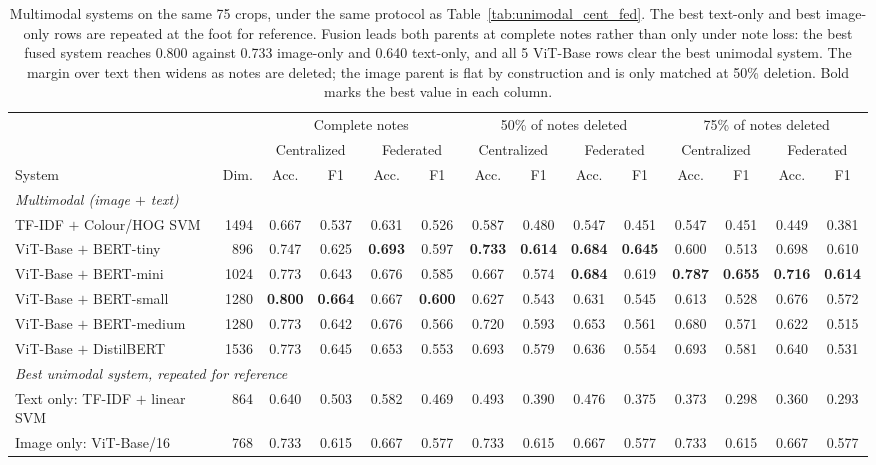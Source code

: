 \documentclass[conference]{IEEEtran}
\begin{document}
\begin{table}[t]
\caption{Multimodal systems on the same 75 crops, under the same protocol as Table~\ref{tab:unimodal_cent_fed}. The best text-only and best image-only rows are repeated at the foot for reference. Fusion leads both parents at complete notes rather than only under note loss: the best fused system reaches 0.800 against 0.733 image-only and 0.640 text-only, and all 5 ViT-Base rows clear the best unimodal system. The margin over text then widens as notes are deleted; the image parent is flat by construction and is only matched at 50\% deletion. Bold marks the best value in each column.}
\label{tab:multimodal_cent_fed}
\centering\footnotesize
\setlength\tabcolsep{4pt}
\begin{tabular}{lrcccccccccccc}
\toprule
 &  & \multicolumn{4}{c}{Complete notes} & \multicolumn{4}{c}{50\% of notes deleted} & \multicolumn{4}{c}{75\% of notes deleted}\\
\cmidrule(lr){3-6}\cmidrule(lr){7-10}\cmidrule(lr){11-14}
 &  & \multicolumn{2}{c}{Centralized} & \multicolumn{2}{c}{Federated} & \multicolumn{2}{c}{Centralized} & \multicolumn{2}{c}{Federated} & \multicolumn{2}{c}{Centralized} & \multicolumn{2}{c}{Federated}\\
\cmidrule(lr){3-4}\cmidrule(lr){5-6}\cmidrule(lr){7-8}\cmidrule(lr){9-10}\cmidrule(lr){11-12}\cmidrule(lr){13-14}
System & Dim. & Acc. & F1 & Acc. & F1 & Acc. & F1 & Acc. & F1 & Acc. & F1 & Acc. & F1\\
\midrule
\multicolumn{14}{l}{\emph{Multimodal (image $+$ text)}}\\
TF-IDF $+$ Colour/HOG SVM & 1494 & 0.667 & 0.537 & 0.631 & 0.526 & 0.587 & 0.480 & 0.547 & 0.451 & 0.547 & 0.451 & 0.449 & 0.381\\
ViT-Base $+$ BERT-tiny & 896 & 0.747 & 0.625 & \textbf{0.693} & 0.597 & \textbf{0.733} & \textbf{0.614} & \textbf{0.684} & \textbf{0.645} & 0.600 & 0.513 & 0.698 & 0.610\\
ViT-Base $+$ BERT-mini & 1024 & 0.773 & 0.643 & 0.676 & 0.585 & 0.667 & 0.574 & \textbf{0.684} & 0.619 & \textbf{0.787} & \textbf{0.655} & \textbf{0.716} & \textbf{0.614}\\
ViT-Base $+$ BERT-small & 1280 & \textbf{0.800} & \textbf{0.664} & 0.667 & \textbf{0.600} & 0.627 & 0.543 & 0.631 & 0.545 & 0.613 & 0.528 & 0.676 & 0.572\\
ViT-Base $+$ BERT-medium & 1280 & 0.773 & 0.642 & 0.676 & 0.566 & 0.720 & 0.593 & 0.653 & 0.561 & 0.680 & 0.571 & 0.622 & 0.515\\
ViT-Base $+$ DistilBERT & 1536 & 0.773 & 0.645 & 0.653 & 0.553 & 0.693 & 0.579 & 0.636 & 0.554 & 0.693 & 0.581 & 0.640 & 0.531\\
\midrule
\multicolumn{14}{l}{\emph{Best unimodal system, repeated for reference}}\\
Text only: TF-IDF $+$ linear SVM & 864 & 0.640 & 0.503 & 0.582 & 0.469 & 0.493 & 0.390 & 0.476 & 0.375 & 0.373 & 0.298 & 0.360 & 0.293\\
Image only: ViT-Base/16 & 768 & 0.733 & 0.615 & 0.667 & 0.577 & 0.733 & 0.615 & 0.667 & 0.577 & 0.733 & 0.615 & 0.667 & 0.577\\
\bottomrule
\end{tabular}
\end{table}
\end{document}
